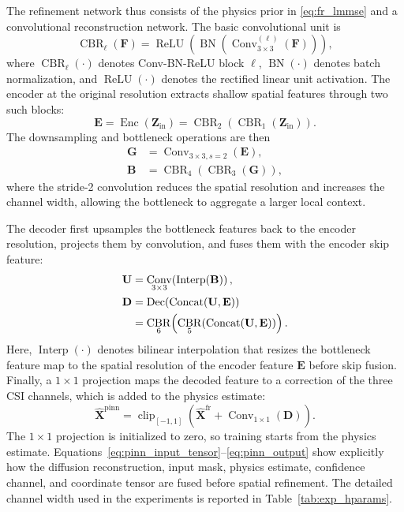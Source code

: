 \documentclass[lettersize,journal]{IEEEtran}
\newcommand{\mat}[1]{\mathbf{#1}}
\DeclareMathOperator{\Concat}{Concat}
\DeclareMathOperator{\Conv}{Conv}
\DeclareMathOperator{\BN}{BN}
\DeclareMathOperator{\ReLU}{ReLU}
\DeclareMathOperator{\CBR}{CBR}
\DeclareMathOperator{\Enc}{Enc}
\DeclareMathOperator{\Dec}{Dec}
\DeclareMathOperator{\Interp}{Interp}
\begin{document}
The refinement network thus consists of the physics prior in \eqref{eq:fr_lmmse} and a convolutional reconstruction network. The basic convolutional unit is
\begin{equation}
    \CBR_{\ell}(\mat{F})
    =
    \ReLU\!\left(\BN\!\left(\Conv_{3\times3}^{(\ell)}(\mat{F})\right)\right),
    \label{eq:cbr_block}
\end{equation}
where $\CBR_{\ell}(\cdot)$ denotes Conv-BN-ReLU block $\ell$, $\BN(\cdot)$ denotes batch normalization, and $\ReLU(\cdot)$ denotes the rectified linear unit activation. The encoder at the original resolution extracts shallow spatial features through two such blocks:
\begin{equation}
    \mat{E}
    =
    \Enc(\mat{Z}_{\mathrm{in}})
    =
    \CBR_{2}\!\left(\CBR_{1}(\mat{Z}_{\mathrm{in}})\right).
    \label{eq:pinn_encoder}
\end{equation}
The downsampling and bottleneck operations are then
\begin{align}
    \mat{G}
    &=\Conv_{3\times3,s=2}(\mat{E}), \\
    \mat{B}
    &=\CBR_{4}\!\left(\CBR_{3}(\mat{G})\right),
    \label{eq:pinn_down_bottleneck}
\end{align}
where the stride-2 convolution reduces the spatial resolution and increases the channel width, allowing the bottleneck to aggregate a larger local context.

The decoder first upsamples the bottleneck features back to the encoder resolution, projects them by convolution, and fuses them with the encoder skip feature:
\begin{align}
    \mat{U}
    &=\Conv_{3\times3}\!\left(\Interp(\mat{B})\right), \\
    \mat{D}
    &=\Dec\!\left(\Concat(\mat{U},\mat{E})\right) \notag\\
    &=\CBR_{6}\!\left(\CBR_{5}\!\left(\Concat(\mat{U},\mat{E})\right)\right).
    \label{eq:pinn_decoder}
\end{align}
Here, $\Interp(\cdot)$ denotes bilinear interpolation that resizes the bottleneck feature map to the spatial resolution of the encoder feature $\mat{E}$ before skip fusion.
Finally, a $1\times1$ projection maps the decoded feature to a correction of the three CSI channels, which is added to the physics estimate:
\begin{equation}
    \widehat{\mat{X}}^{\mathrm{pinn}}
    =
    \operatorname{clip}_{[-1,1]}\!\left(\widehat{\mat{X}}^{\mathrm{fr}}+\Conv_{1\times1}(\mat{D})\right).
    \label{eq:pinn_output}
\end{equation}
The $1\times1$ projection is initialized to zero, so training starts from the physics estimate. Equations~\eqref{eq:pinn_input_tensor}--\eqref{eq:pinn_output} show explicitly how the diffusion reconstruction, input mask, physics estimate, confidence channel, and coordinate tensor are fused before spatial refinement. The detailed channel width used in the experiments is reported in Table~\ref{tab:exp_hparams}.
\end{document}
